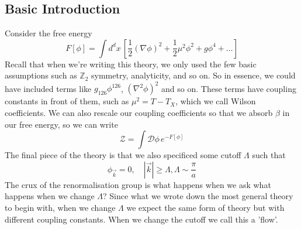 \subsection{Basic Introduction} 
Consider the free energy 
\[
	F [ \phi ] = \int d^ d x\,  \left[  \frac{1}{2 } ( \nabla \phi ) ^ 2 + \frac{1}{2 } \mu ^ 2 \phi ^ 2 + g \phi ^ 4 + \dots  \right] 
\] Recall that when we're writing this theory, 
we only used the few basic assumptions such as $ \mathbb{ Z} _ 2 $ symmetry, 
analyticity, and so on. 
So in essence, we could have included terms like 
$ g _{ 126} \phi ^{ 126 } $,  $ ( \nabla ^ 2 \phi ) ^ 2 $ and so on. 
These terms have coupling constants in front of them, 
such as $ \mu ^ 2 = T - T _ X $, which we call Wilson coefficients. 
We can also rescale our coupling coefficients so that we 
absorb $ \beta $ in our free energy, so we can write 
\[
	\mathcal{Z  } = \int \mathcal{ D } \phi \, e ^{  - F [ \phi ] }
\]  The final piece of the theory is that we also 
specificed some cutoff $ \Lambda $ such that 
\[
 \phi _{ \vec{k} } =0 , \quad  |  \vec{k} |  \geq \Lambda, \Lambda \sim \frac{\pi}{ a }
\] The crux of the renormalisation group 
is what happens when we ask what happens when we change $ \Lambda $? 
Since what we wrote down the most general theory to begin with, 
when we change  $ \Lambda  $ we expect the same form of theory 
but with different coupling constants. 
When we change the cutoff we call this a 'flow'. 

